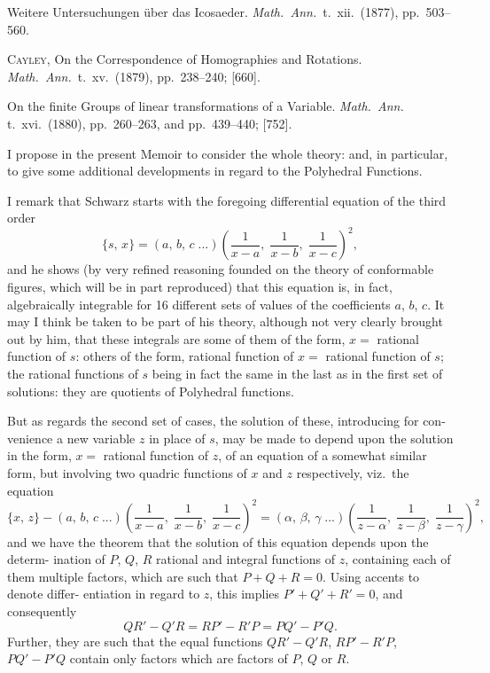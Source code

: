 \documentclass[11pt]{article}
\begin{document}
\noindent
{} Weitere Untersuchungen \"uber das Icosaeder. \textit{Math.\ Ann.}\ t.\ xii.\ (1877),
pp.\ 503--560.

\noindent
\textsc{Cayley}, On the Correspondence of Homographies and Rotations. \textit{Math.\ Ann.}\ t.\ xv.\
(1879), pp.\ 238--240; [660].

\noindent
{} On the finite Groups of linear transformations of a Variable. \textit{Math.\ Ann.}
t.\ xvi.\ (1880), pp.\ 260--263, and pp.\ 439--440; [752].

\medskip

I propose in the present Memoir to consider the whole theory: and, in particular,
to give some additional developments in regard to the Polyhedral Functions.

I remark that Schwarz starts with the foregoing differential equation of the third
order
\[
   \{s,\, x\} = (a,\, b,\, c\;.{}.\!.) \left(\frac{1}{x - a},\; \frac{1}{x - b},\; \frac{1}{x - c}\right)^{\!2}\!,
\]
and he shows (by very refined reasoning founded on the theory of conformable figures,
which will be in part reproduced) that this equation is, in fact, algebraically integrable
for 16 different sets of values of the coefficients $a$, $b$, $c$. It may I think be taken
to be part of his theory, although not very clearly brought out by him, that these
integrals are some of them of the form, $x =$ rational function of $s$: others of the form,
rational function of $x =$ rational function of $s$; the rational functions of $s$ being in fact
the same in the last as in the first set of solutions: they are quotients of Polyhedral
functions.

But as regards the second set of cases, the solution of these, introducing for con-
venience a new variable $z$ in place of $s$, may be made to depend upon the solution
in the form, $x = $ rational function of $z$, of an equation of a somewhat similar form, but
involving two quadric functions of $x$ and $z$ respectively, viz.\ the equation
\[
   \{x,\, z\} - (a,\, b,\, c\;.{}.\!.) \left(\frac{1}{x - a},\; \frac{1}{x - b},\; \frac{1}{x - c}\right)^{\!2}\!
   = (\alpha,\, \beta,\, \gamma\;.{}.\!.) \left(\frac{1}{z - \alpha},\; \frac{1}{z - \beta},\; \frac{1}{z - \gamma}\right)^{\!2}\!,
\]
and we have the theorem that the solution of this equation depends upon the determ-
ination of $P$, $Q$, $R$ rational and integral functions of $z$, containing each of them
multiple factors, which are such that $P + Q + R = 0$. Using accents to denote differ-
entiation in regard to $z$, this implies $P' + Q' + R' = 0$, and consequently
\[
   QR' - Q'R = RP' - R'P = PQ' - P'Q.
\]
Further, they are such that the equal functions $QR' - Q'R$, $RP' - R'P$, $PQ' - P'Q$ contain
only factors which are factors of $P$, $Q$ or $R$.
\end{document}

